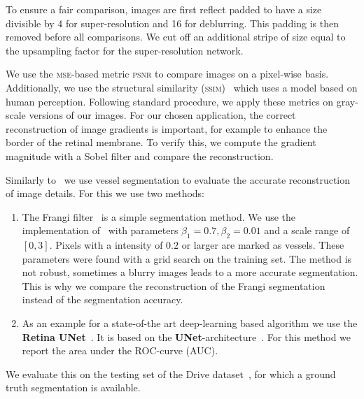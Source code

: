 \documentclass{scrartcl}
\begin{document}
To ensure a fair comparison, images are first reflect padded to have a size divisible by 4 for super-resolution and 16 for deblurring.
This padding is then removed before all comparisons.
We cut off an additional stripe of size equal to the upsampling factor for the super-resolution network.

We use the \textsc{mse}-based metric \textsc{psnr} to compare images on a pixel-wise basis.
Additionally, we use the structural similarity (\textsc{ssim})~\cite{Ssim} which uses a model based on human perception.
Following standard procedure, we apply these metrics on gray-scale versions of our images.
For our chosen application, the correct reconstruction of image gradients is important, for example to enhance the border of the retinal membrane.
To verify this, we compute the gradient magnitude with a Sobel filter and compare the reconstruction.

Similarly to~\cite{SaliencyGAN} we use vessel segmentation to evaluate the accurate reconstruction of image details.
For this we use two methods:
\begin{enumerate}
  \item The Frangi filter~\cite{Frangi} is a simple segmentation method.
  We use the implementation of~\cite{Scikit-image} with parameters $\beta_1 = 0.7, \beta_2=0.01$ and a scale range of $[0, 3]$.
  Pixels with a intensity of $0.2$ or larger are marked as vessels.
  These parameters were found with a grid search on the training set.
  The method is not robust, sometimes a blurry images leads to a more accurate segmentation.
  This is why we compare the reconstruction of the Frangi segmentation instead of the segmentation accuracy.
\item As an example for a state-of-the art deep-learning based algorithm we use the \textbf{Retina UNet}~\cite{RetinaUnet}.
  It is based on the \textbf{UNet}-architecture~\cite{Unet}.
  For this method we report the area under the \textsc{ROC}-curve (\textsc{AUC}).
\end{enumerate}
We evaluate this on the testing set of the Drive dataset~\cite{Drive}, for which a ground truth segmentation is available.
\end{document}
